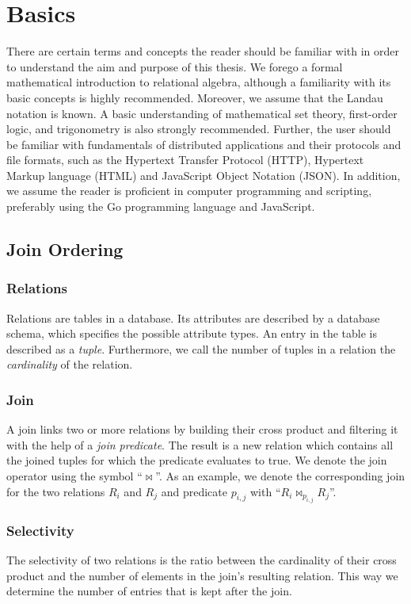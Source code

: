 \section{Basics}
\label{sec:basics}

There are certain terms and concepts the reader should be familiar with in order to understand the aim and purpose of this thesis. 
We forego a formal mathematical introduction to relational algebra, although a familiarity with its basic concepts is highly recommended. 
Moreover, we assume that the Landau notation is known. A basic understanding of mathematical set theory, first-order logic, and trigonometry is also strongly recommended. Further, the user should be familiar with fundamentals of distributed applications and their protocols and file formats, such as the Hypertext Transfer Protocol (HTTP), Hypertext Markup language (HTML) and JavaScript Object Notation (JSON). In addition, we assume the reader is proficient in computer programming and scripting, preferably using the Go programming language and JavaScript.

\subsection{Join Ordering}
\subsubsection{Relations}
Relations are tables in a database. 
Its attributes are described by a database schema, which specifies the possible attribute types.
An entry in the table is described as a \textit{tuple}. Furthermore, we call the number of tuples in a relation the \textit{cardinality} of the relation.

\subsubsection{Join}
A join links two or more relations by building their cross product and filtering it with the help of a \textit{join predicate}. 
The result is a new relation which contains all the joined tuples for which the predicate evaluates to true. We denote the join operator using the symbol ``$\Join$''. 
As an example, we denote the corresponding join for the two relations $R_i$ and $R_j$ and predicate ${p_{i,j}}$ with ``$R_i \Join_{p_{i,j}} R_j$''.

\subsubsection{Selectivity}
The selectivity of two relations is the ratio between the cardinality of their cross product and the number of elements in the join's resulting relation. 
This way we determine the number of entries that is kept after the join.

